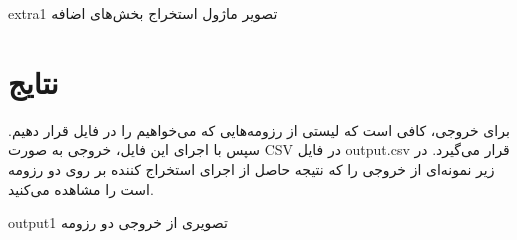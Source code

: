 \documentclass{article}
\begin{document}
	\begin{image}{0.4}{extra}{1}
	تصویر ماژول استخراج بخش‌های اضافه
	\end{image}

	\section{نتایج}
	
	برای خروجی، کافی است که لیستی از رزومه‌هایی که می‌خواهیم را در فایل  قرار دهیم. سپس با اجرای این فایل، خروجی به صورت CSV در فایل output.csv قرار می‌گیرد. در زیر نمونه‌ای از خروجی را که نتیجه حاصل از اجرای استخراج کننده بر روی دو رزومه است را مشاهده می‌کنید.
	
	
	
	
	\begin{image}{0.3}{output}{1}
		تصویری از خروجی دو رزومه
	\end{image}
	
\end{document}
